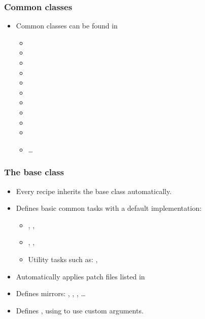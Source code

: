 \begin{frame}
  \frametitle{Common classes}
  \begin{itemize}
    \item Common classes can be found in 
    \begin{itemize}
      \item {}
      \item {}
      \item {}
      \item {}
      \item {}
      \item {}
      \item {}
      \item {}
      \item {}
      \item {}
      \item \dots
    \end{itemize}
  \end{itemize}
\end{frame}

\begin{frame}
  \frametitle{The base class}
  \begin{itemize}
    \item Every recipe inherits the base class automatically.
    \item Defines basic common tasks with a default implementation:
      \begin{itemize}
        \item {}, , 
        \item {}, , 
        \item Utility tasks such as: , 
      \end{itemize}
    \item Automatically applies patch files listed in 
    \item Defines mirrors: ,
      , , \dots
    \item Defines , using  to use
      custom arguments.
  \end{itemize}
\end{frame}

